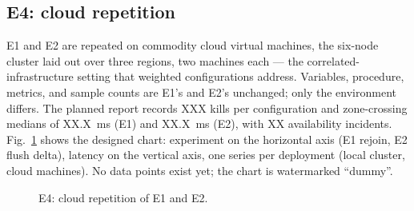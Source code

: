 \documentclass[10pt,journal,letterpaper]{IEEEtran}
\begin{document}
\subsection{E4: cloud repetition}
E1 and E2 are repeated on commodity cloud virtual machines, the six-node
cluster laid out over three regions, two machines each --- the
correlated-infrastructure setting that weighted configurations address.
Variables, procedure, metrics, and sample counts are E1's and E2's
unchanged; only the environment differs. The planned report records
$\mathrm{XXX}$ kills per configuration and zone-crossing medians of
XX.X~ms (E1) and XX.X~ms (E2), with $\mathrm{XX}$
availability incidents. Fig.~\ref{fig:e4} shows the designed chart:
experiment on the horizontal axis (E1 rejoin, E2 flush delta), latency on
the vertical axis, one series per deployment (local cluster, cloud
machines). No data points exist yet; the chart is watermarked ``dummy''.

\begin{figure}[t]
\centering
{}
\caption{E4: cloud repetition of E1 and E2.}
\label{fig:e4}
\end{figure}
\end{document}
